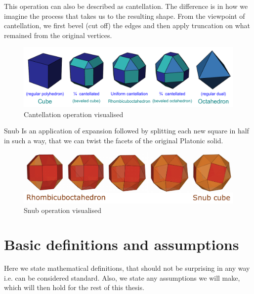\begin{description}
    This operation can also be described as cantellation. The difference is in how we imagine the process that takes us to the resulting shape. From the viewpoint of cantellation, we first bevel (cut off) the edges and then apply truncation on what remained from the original vertices.
    \begin{figure}[H]
        \centering
        \includegraphics[width=1\textwidth]{../Resources/Figs/cantellation.pdf}
        \caption{Cantellation operation visualised \cite{wikimedia-cube-cantellation}}
        \label{fig:op_cantellation}
    \end{figure}
    \begin{highlight}
    \item[Snub] Is an application of expansion followed by splitting each new square in half in such a way, that we can twist the facets of the original Platonic solid.
    \end{highlight}
    \begin{figure}[H]
        \centering
        \includegraphics[width=1\textwidth]{../Resources/Figs/op_snub.pdf}
        \caption{Snub operation visualised \cite{natal-polyhed-viewer}}
        \label{fig:op_snub}
    \end{figure}
    
\end{description}

\section{Basic definitions and assumptions}

Here we state mathematical definitions, that should not be surprising in any way i.e. can be considered standard. Also, we state any assumptions we will make, which will then hold for the rest of this thesis.

